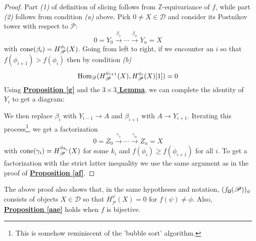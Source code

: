 \documentclass{article}
\theoremstyle{definition}
\begin{document}
\begin{proof}
Part \textit{(1)} of definition of slicing follows from $\mathbb{Z}$-equivariance of $f$, while part \textit{(2)} follows from condition \textit{(a)} above. Pick $0 \not = X \in \mathscr{D}$ and consider its Postnikov tower with respect to $\mathscr{P}$: $$0=Y_0 \overset{\beta_1}{\longrightarrow} \cdots \overset{\beta_n}{\longrightarrow} Y_n=X$$
with $\textnormal{cone}(\beta_i)=H_{\mathscr{P}}^{\phi_i}(X)$. Going from left to right, if we encounter an $i$ so that $f(\phi_{i+1}) > f(\phi_i)$ then by condition \textit{(b)} $$\textnormal{Hom}_{\mathscr{D}}(H_{\mathscr{P}}^{\phi_{i+1}}(X),H_{\mathscr{P}}^{\phi_i}(X)[1])=0$$
Using \hyperref[g]{\textbf{Proposition \ref*{g}}} and the \hyperref[s]{\textbf{$3 \times 3$ Lemma}}, we can complete the identity of $Y_i$ to get a diagram: 
\begin{center}
\end{center}

We then replace $\beta_i$ with $Y_{i-1} \longrightarrow A$ and $\beta_{i+1}$ with $A \longrightarrow Y_{i+1}$. Iterating this process\footnote{This is somehow reminiscent of the 'bubble sort' algorithm.}, we get a factorization $$0=Z_0 \overset{\gamma_1}{\longrightarrow} \cdots \overset{\gamma_n}{\longrightarrow} Z_n=X$$
with $\textnormal{cone}(\gamma_i)=H_{\mathscr{P}}^{\phi_{k_i}}(X)$ for some $k_i$ and $f(\phi_i) \ge f(\phi_{i+1})$ for all $i$. To get a factorization with the strict latter inequality we use the same argument as in the proof of \hyperref[af]{\textbf{Proposition \ref*{af}}}.
\end{proof}

The above proof also shows that, in the same hypotheses and notation, $(f_{\textnormal{\Libra}}(\mathscr{P}))_{\phi}$ consists of objects $X \in \mathscr{D}$ so that $H_{\mathscr{P}}^{\psi}(X)=0$ for $ f(\psi) \not = \phi$. Also, \hyperref[aae]{\textbf{Proposition \ref*{aae}}} holds when $f$ is bijective.\\
\end{document}
